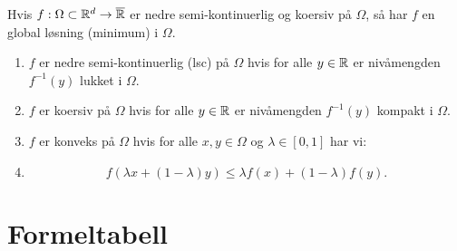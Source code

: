 Hvis \(f: \Omega \subset \mathbb{R}^d \to \overline{\mathbb{R}}\) er nedre semi-kontinuerlig og koersiv på \(\Omega\), så har \(f\) en global løsning (minimum) i \(\Omega\).

\begin{enumerate}
  \item \(f\) er nedre semi-kontinuerlig (lsc) på \(\Omega\) hvis for alle \(y \in \mathbb{R}\) er nivåmengden \(f^{-1}(y)\) lukket i \(\Omega\).
  \item \(f\) er koersiv på \(\Omega\) hvis for alle \(y \in \mathbb{R}\) er nivåmengden \(f^{-1}(y)\) kompakt i \(\Omega\).
  \item \(f\) er konveks på \(\Omega\) hvis for alle \(x, y \in \Omega\) og \(\lambda \in [0, 1]\) har vi:
  \item
        \[
          f(\lambda x + (1 - \lambda)y) \leq \lambda f(x) + (1 - \lambda)f(y).
        \]
\end{enumerate}

\chapter{Formeltabell}

